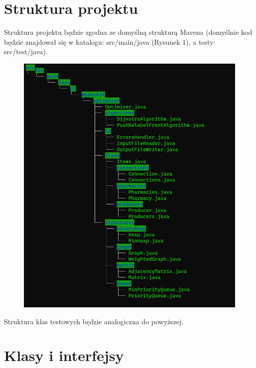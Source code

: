 \documentclass{article}
\begin{document}
\section{Struktura projektu}
{\fontsize{13}{13}\selectfont
    Struktura projektu będzie zgodna ze domyślną strukturą Mavena (domyślnie kod będzie znajdował się w katalogu: src/main/java (Rysunek 1), a testy: src/test/java).
    
    \begin{figure} [hbt!]
        \centering
        \includegraphics[width=12cm]{projectStructure.png}
    \end{figure}
    
    \newpage
    Struktura klas testowych będzie analogiczna do powyższej.
}

\newpage

\section{Klasy i interfejsy}
\end{document}
